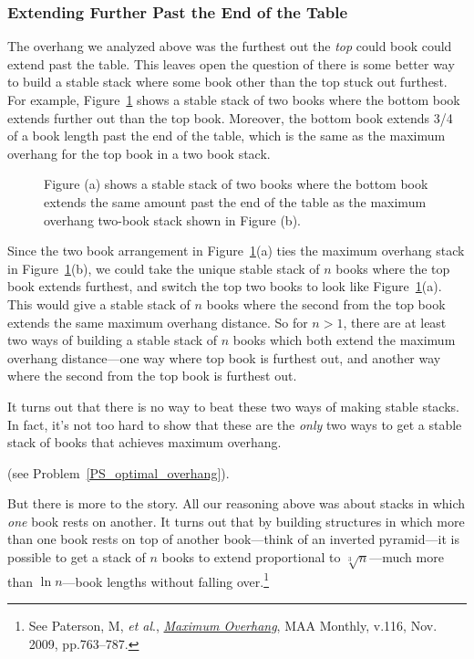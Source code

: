 \subsubsection{Extending Further Past the End of the Table}
The overhang we analyzed above was the furthest out the \emph{top}
could book could extend past the table.  This leaves open the question
of there is some better way to build a stable stack where some book
other than the top stuck out furthest.  For example,
Figure~\ref{lab:bottom-book-furthest} shows a stable stack of two
books where the bottom book extends further out than the top book.
Moreover, the bottom book extends 3/4 of a book length past the end of
the table, which is the same as the maximum overhang for the top book
in a two book stack.

\begin{figure}
\qquad
{}

\caption{Figure (a) shows a stable stack of two books where the
  bottom book extends the same amount past the end of the table as
  the maximum overhang two-book stack shown in Figure (b).}
\label{lab:bottom-book-furthest}
\end{figure}

Since the two book arrangement in
Figure~\ref{lab:bottom-book-furthest}(a) ties the maximum overhang
stack in Figure~\ref{lab:bottom-book-furthest}(b), we could take the
unique stable stack of $n$ books where the top book extends furthest,
and switch the top two books to look like
Figure~\ref{lab:bottom-book-furthest}(a).  This would give a stable
stack of $n$ books where the second from the top book extends the same
maximum overhang distance.  So for $n>1$, there are at least two ways
of building a stable stack of $n$ books which both extend the maximum
overhang distance---one way where top book is furthest out, and
another way where the second from the top book is furthest out.

It turns out that there is no way to beat these two ways of making
stable stacks.  In fact, it's not too hard to show that these are the
\emph{only} two ways to get a stable stack of books that achieves
maximum overhang.
\begin{editingnotes}
(see Problem~\ref{PS_optimal_overhang}).
\end{editingnotes}

But there is more to the story.  All our reasoning above was about
stacks in which \emph{one} book rests on another.  It turns out that
by building structures in which more than one book rests on top of
another book---think of an inverted pyramid---it is possible to get
a stack of $n$ books to extend proportional to $\sqrt[3]{n}$---much
more than $\ln n$---book lengths without falling over.\footnote{See
  Paterson, M, \emph{et al}.,
  \href{http://mathdl.maa.org/mathDL/22/?pa=content&sa=viewDocument&nodeId=3623&pf=1}
       {\emph{Maximum Overhang}}, MAA Monthly, v.116, Nov. 2009,
         pp.763--787.}

